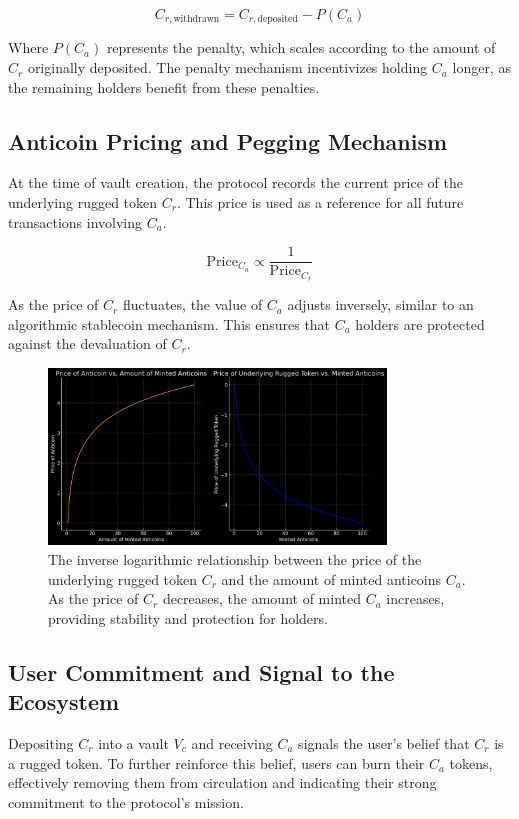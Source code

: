 \documentclass{article}
\begin{document}
\begin{equation}
C_{r,\text{withdrawn}} = C_{r,\text{deposited}} - P(C_a)
\end{equation}

Where $P(C_a)$ represents the penalty, which scales according to the amount of $C_r$ originally deposited. The penalty mechanism incentivizes holding $C_a$ longer, as the remaining holders benefit from these penalties.

\subsection{Anticoin Pricing and Pegging Mechanism}
At the time of vault creation, the protocol records the current price of the underlying rugged token $C_r$. This price is used as a reference for all future transactions involving $C_a$.

\begin{equation}
\text{Price}_{C_a} \propto \frac{1}{\text{Price}_{C_r}}
\end{equation}

As the price of $C_r$ fluctuates, the value of $C_a$ adjusts inversely, similar to an algorithmic stablecoin mechanism. This ensures that $C_a$ holders are protected against the devaluation of $C_r$.

\begin{figure}[h]
\centering
\includegraphics[width=0.8\textwidth]{images/2.png}
\caption{The inverse logarithmic relationship between the price of the underlying rugged token $C_r$ and the amount of minted anticoins $C_a$. As the price of $C_r$ decreases, the amount of minted $C_a$ increases, providing stability and protection for holders.}
\label{fig:minted_anticoins}
\end{figure}

\subsection{User Commitment and Signal to the Ecosystem}
Depositing $C_r$ into a vault $V_c$ and receiving $C_a$ signals the user's belief that $C_r$ is a rugged token. To further reinforce this belief, users can burn their $C_a$ tokens, effectively removing them from circulation and indicating their strong commitment to the protocol's mission.
\end{document}

